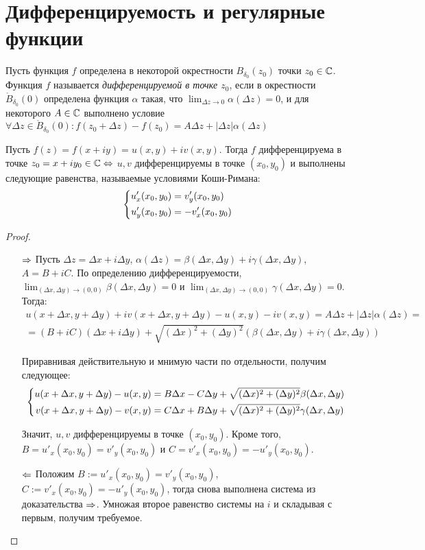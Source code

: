 \section{Дифференцируемость и регулярные функции}

\begin{definition}
	Пусть функция $f$ определена в некоторой окрестности $B_{\delta_0}(z_0)$ точки  $z_0 \in \mathbb{C}$. Функция $f$ называется \textit{дифференцируемой в точке $z_0$}, если в окрестности $\mathring B_{\delta_0}{(0)}$ определена функция $\alpha$ такая, что $\lim_{\Delta z \to 0}\alpha(\Delta z) = 0$, и для некоторого $A \in \mathbb{C}$ выполнено условие $\forall \Delta z \in \mathring B_{\delta_0}{(0)}: f(z_0 + \Delta z) - f(z_0) = A\Delta z + |\Delta z|\alpha(\Delta z)$
\end{definition}

\begin{theorem}
	Пусть $f(z) = f(x + iy) = u(x, y) + iv(x, y)$. Тогда $f$ дифференцируема в точке $z_0 = x + iy_0 \in \mathbb{C} \Leftrightarrow$ $u, v$ дифференцируемы в точке $(x_0, y_0)$ и выполнены следующие равенства, называемые условиями Коши-Римана:
	\[\left\{\begin{aligned}u'_x(x_0, y_0) &= v'_y(x_0, y_0) \\ u'_y(x_0, y_0) &= -v'_x(x_0, y_0)\end{aligned}\right.\]
\end{theorem}

\begin{proof}~
	\begin{itemize}
		\item[$\Rightarrow$] Пусть $\Delta z = \Delta x + i \Delta y$, $\alpha(\Delta z) = \beta(\Delta x, \Delta y) + i\gamma(\Delta x, \Delta y)$, $A = B + iC$. По определению дифференцируемости, $\lim_{(\Delta x, \Delta y) \to (0, 0)}\beta(\Delta x, \Delta y) = 0$ и $\lim_{(\Delta x, \Delta y) \to (0, 0)}\gamma(\Delta x, \Delta y) = 0$. Тогда:
		\begin{multline*}
			u(x + \Delta x, y + \Delta y) + iv(x + \Delta x, y + \Delta y) - u(x, y) - iv(x, y) =  A\Delta z + |\Delta z|\alpha(\Delta z) =
			\\
			= (B + iC)(\Delta x + i\Delta y) + \sqrt{(\Delta x)^2 + (\Delta y)^2}(\beta(\Delta x, \Delta y) + i\gamma(\Delta x, \Delta y))
		\end{multline*}
		
		Приравнивая действительную и мнимую части по отдельности, получим следующее:
		\[\left\{\begin{aligned}
			u(x + \Delta x, y + \Delta y) - u(x, y) &=  B\Delta x - C\Delta y + \sqrt{(\Delta x)^2 + (\Delta y)^2}\beta(\Delta x, \Delta y)
			\\
			v(x + \Delta x, y + \Delta y) - v(x, y) &= C\Delta x + B\Delta y + \sqrt{(\Delta x)^2 + (\Delta y)^2}\gamma(\Delta x, \Delta y)
		\end{aligned}\right.\]
	
		Значит, $u, v$ дифференцируемы в точке $(x_0, y_0)$. Кроме того, $B = u'_x(x_0, y_0) = v'_y(x_0, y_0)$ и $C = v'_x(x_0, y_0) = -u'_y(x_0, y_0)$.
		
		\item[$\Leftarrow$] Положим $B := u'_x(x_0, y_0) = v'_y(x_0, y_0)$, $C := v'_x(x_0, y_0) = -u'_y(x_0, y_0)$, тогда снова выполнена система из доказательства $\Rightarrow$. Умножая второе равенство системы на $i$ и складывая с первым, получим требуемое.\qedhere
	\end{itemize}
\end{proof}

